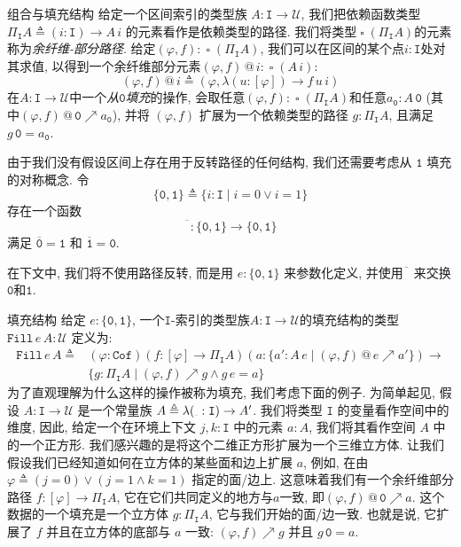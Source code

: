 \documentclass[aspectratio=169,xcolor=dvipsnames]{beamer}
\newcommand\calU{\mathcal{U}}
\newcommand\Fill{\mathtt{Fill}}
\newcommand\ttI{\mathtt{I}}
\newcommand\ttzero{\mathtt{0}}
\newcommand\ttone{\mathtt{1}}
\newcommand{\ul}{{\scalebox{0.4}[0.4]{\_}}}
\newcommand\Cof{\mathtt{Cof}}
\DeclareMathOperator\cofibpart{\square}
\begin{document}
\begin{frame}{组合与填充结构}
  给定一个区间索引的类型族 $A : \ttI\to\calU$, 我们把依赖函数类型 $\Pi_{\ttI}A\triangleq(i:\ttI)\to A\,i$ 的元素看作是依赖类型的路径. 我们将类型$\cofibpart(\Pi_{\ttI}A)$的元素称为\emph{余纤维-部分路径}. 给定$(\varphi,f) : \cofibpart(\Pi_{\ttI}A)$, 我们可以在区间的某个点$i:\ttI$处对其求值, 以得到一个余纤维部分元素$(\varphi,f)\,@\,i : \cofibpart(A\,i)$:
  \[
  (\varphi,f)\,@\,i \triangleq (\varphi,\lambda(u:[\varphi])\to f\,u\,i)
  \]
  在$A : \ttI\to\calU$中一个\emph{从$\mathtt{0}$填充}的操作, 会取任意$(\varphi,f):\cofibpart(\Pi_{\ttI}A)$和任意$a_{\mathtt{0}}:A\,\mathtt{0}$ (其中$(\varphi,f)\,@\,\mathtt{0} \nearrow a_{\mathtt{0}}$), 并将 $(\varphi,f)$ 扩展为一个依赖类型的路径 $g:\Pi_{\ttI}A$, 且满足$g\,\mathtt{0} = a_{\mathtt{0}}$.

  由于我们没有假设区间上存在用于反转路径的任何结构, 我们还需要考虑从 $\ttone$ 填充的对称概念. 令
  \[
  \{\ttzero,\ttone\}\triangleq\{i:\ttI\mid i=0\lor i=1\}
  \]
  存在一个函数
  \[
  \overline{\phantom{\ttzero}} : \{ \ttzero, \ttone \} \to \{ \ttzero, \ttone \}
  \]
  满足 $\overline{\ttzero} = \ttone$ 和 $\overline{\ttone} = \ttzero$.

  在下文中, 我们将不使用路径反转, 而是用 $e:\{\ttzero,\ttone\}$ 来参数化定义, 并使用$\overline{\phantom{\ttzero}}$ 来交换$\ttzero$和$\ttone$.
\end{frame}

\begin{frame}{填充结构}
  给定 $e : \{\ttzero,\ttone\}$, 一个$\ttI$-索引的类型族$A:\ttI\to\calU$的填充结构的类型 $\Fill\,e\,A : \calU$ 定义为:
  \begin{align*}
    \Fill\,e\,A\triangleq &(\varphi:\Cof)(f:[\varphi]\to\Pi_{\ttI}A)(a:\{a':A\,e\mid(\varphi,f)\,@\,e\nearrow a'\})\to \\
    &\{g:\Pi_{\ttI}A\mid(\varphi,f)\nearrow g\land g\,e=a\}
  \end{align*}
  为了直观理解为什么这样的操作被称为填充, 我们考虑下面的例子. 为简单起见, 假设 $A : \ttI \to \calU$ 是一个常量族 $A\triangleq\lambda(\ul:\ttI)\to A'$. 我们将类型 $\ttI$ 的变量看作空间中的维度, 因此, 给定一个在环境上下文 $j,k:\ttI$ 中的元素 $a:A$, 我们将其看作空间 $A$ 中的一个正方形. 我们感兴趣的是将这个二维正方形扩展为一个三维立方体. 让我们假设我们已经知道如何在立方体的某些面和边上扩展 $a$, 例如, 在由 $\varphi \triangleq (j=0) \lor (j=1\land k=1)$ 指定的面/边上. 这意味着我们有一个余纤维部分路径 $f:[\varphi]\to\Pi_{\ttI}A$, 它在它们共同定义的地方与$a$一致, 即$(\varphi,f)\,@\,\ttzero\nearrow a$. 这个数据的一个填充是一个立方体 $g : \Pi_{\ttI}A$, 它与我们开始的面/边一致. 也就是说, 它扩展了 $f$ 并且在立方体的底部与 $a$ 一致: $(\varphi,f)\nearrow g$ 并且 $g\,\ttzero = a$.
\end{frame}
\end{document}
